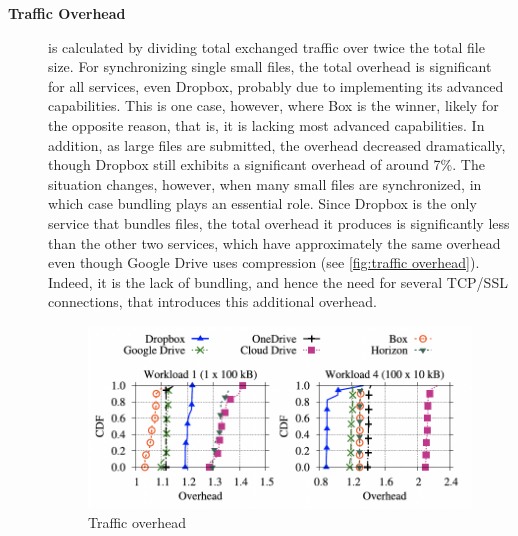 \begin{description}
    \item[\textbf{Traffic Overhead}] is calculated by dividing total exchanged traffic over twice the total file size. For synchronizing single small files, the total overhead is significant for all services, even Dropbox, probably due to implementing its advanced capabilities. This is one case, however, where Box is the winner, likely for the opposite reason, that is, it is lacking most advanced capabilities. In addition, as large files are submitted, the overhead decreased dramatically, though Dropbox still exhibits a significant overhead of around 7\%. The situation changes, however, when many small files are synchronized, in which case bundling plays an essential role. Since Dropbox is the only service that bundles files, the total overhead it produces is significantly less than the other two services, which have approximately the same overhead even though Google Drive uses compression (see \autoref{fig:traffic overhead}). Indeed, it is the lack of bundling, and hence the need for several TCP/SSL connections, that introduces this additional overhead.

    \begin{figure} [h]
        \centering
        \includegraphics[scale=0.7]{images/traffic_overhead}
        \caption{\label{fig:traffic overhead}Traffic overhead}
    \end{figure}

\end{description}

